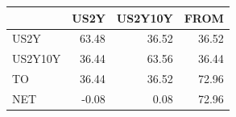 \begin{tabular}{lrrr}
\toprule
 & US2Y & US2Y10Y & FROM \\
\midrule
US2Y & 63.48 & 36.52 & 36.52 \\
US2Y10Y & 36.44 & 63.56 & 36.44 \\
TO & 36.44 & 36.52 & 72.96 \\
NET & -0.08 & 0.08 & 72.96 \\
\bottomrule
\end{tabular}
